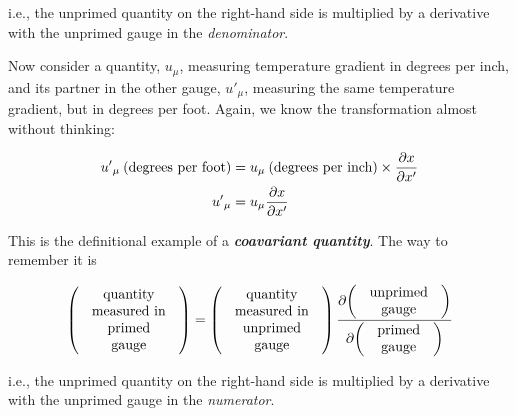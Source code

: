 \documentclass[no-fonts,nols]{tufte-handout}
\begin{document}
i.e., the unprimed quantity on the right-hand side is multiplied by a
derivative with the unprimed gauge in the \textit{denominator}.

Now consider a quantity, $u_\mu$, measuring temperature gradient in
degrees per inch, and its partner in the other gauge, ${u'}_{\mu}$,
measuring the same temperature gradient, but in degrees per foot.
Again, we know the transformation almost without thinking:

\begin{equation}
\begin{split}
	{u'}_{\mu}\:\text{(degrees per foot)} &= 
    u_\mu\:\text{(degrees per inch)} 
    \times
    \frac{\partial{x}}{\partial{x'}} \\
	{u'}_{\mu} &= u_\mu {} \frac{\partial{x}}{\partial{x'}}
\end{split}
\end{equation}

This is the definitional example of a \textbf{\textit{coavariant
quantity}}. The way to remember it is

\begin{equation}
    \left(\text{
        \begin{tabular}{c}
             quantity \\ measured in \\ primed \\ gauge 
        \end{tabular}
    }\right) = 
    \left(\text{
        \begin{tabular}{c}
            quantity \\ measured in \\ unprimed \\ gauge
        \end{tabular}
    }\right) 
    \frac{\partial{
            \left(\text{
                \begin{tabular}{c}
                     unprimed \\ gauge
                \end{tabular}
            }\right)
         }}
         {\partial{
            \left(\text{
                \begin{tabular}{c}
                     primed \\ gauge
                \end{tabular}
            }\right)
         }}
\end{equation}

i.e., the unprimed quantity on the right-hand side is multiplied by a 
derivative with the unprimed gauge in the \textit{numerator}. 
\end{document}
